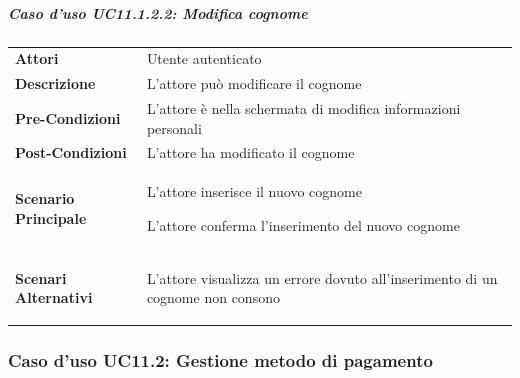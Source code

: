 \subparagraph{Caso d'uso UC11.1.2.2: Modifica cognome}
\label{UC11_1_2_2}
\begin{minipage}{\linewidth}
	\begin{tabular}{ l | p{11cm}}
		\hline
		\rowcolor{Gray}
		\multicolumn{2}{c}{UC11.1.2.2 - Modifica cognome} \\
		\hline
		\textbf{Attori} & Utente autenticato \\
		\textbf{Descrizione} & L'attore può modificare il cognome\\
		\textbf{Pre-Condizioni} & L'attore è nella schermata di modifica informazioni personali\\
		\textbf{Post-Condizioni} & L'attore ha modificato il cognome \\
		\textbf{Scenario Principale} & 
		\begin{enumerate*}[label=(\arabic*.),itemjoin={\newline}]
			\item L'attore inserisce il nuovo cognome
			\item L'attore conferma l'inserimento del nuovo cognome
		\end{enumerate*}\\
		\textbf{Scenari Alternativi} & 
		\begin{enumerate*}[label=(\arabic*.),itemjoin={\newline}]
			\item L'attore visualizza un errore dovuto all'inserimento di un cognome non consono
		\end{enumerate*}
	\end{tabular}
\end{minipage}

\subsubsection{Caso d'uso UC11.2: Gestione metodo di pagamento}
\label{UC11_2}

